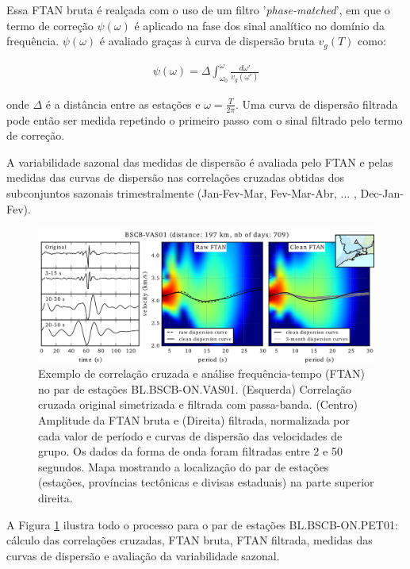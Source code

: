 Essa FTAN bruta é realçada com o uso de um filtro '\textit{phase-matched}', em que o termo de correção $\psi(\omega)$ é aplicado na fase dos sinal analítico no domínio da frequência. $\psi(\omega)$ é avaliado graças à curva de dispersão bruta $v_{g}(T)$ como:

\begin{eqnarray}
\psi(\omega) = \Delta \int_{\omega_{0}}^{\omega} \frac{{d\omega}'}{v_{g}({\omega}')}
\end{eqnarray}

onde $\Delta$ é a distância entre as estações e $\omega = \frac{T}{2\pi}$. Uma curva de dispersão filtrada pode então ser medida repetindo o primeiro passo com o sinal filtrado pelo termo de correção.

A variabilidade sazonal das medidas de dispersão é avaliada pelo FTAN e pelas medidas das curvas de dispersão nas correlações cruzadas obtidas dos subconjuntos sazonais trimestralmente (Jan-Fev-Mar, Fev-Mar-Abr, ... , Dec-Jan-Fev). 

\begin{figure}[!ht]
\centering
\includegraphics[scale=0.8]{Figs/correlacao_FTAN.png}
\caption[Exemplo de correlação cruzada e análise frequência-tempo (FTAN) no par de estações BL.BSCB-ON.PET01.]{Exemplo de correlação cruzada e análise frequência-tempo (FTAN) no par de estações BL.BSCB-ON.VAS01. (Esquerda) Correlação cruzada original simetrizada e filtrada com passa-banda. (Centro) Amplitude da FTAN bruta e (Direita) filtrada, normalizada por cada valor de período e curvas de dispersão das velocidades de grupo. Os dados da forma de onda foram filtradas entre 2 e 50 segundos. Mapa mostrando a localização do par de estações (estações, províncias tectônicas e divisas estaduais) na parte superior direita.}
\label{correlacao_FTAN}
\end{figure}

A Figura \ref{correlacao_FTAN} ilustra todo o processo para o par de estações BL.BSCB-ON.PET01: cálculo das correlações cruzadas, FTAN bruta, FTAN filtrada, medidas das curvas de dispersão e avaliação da variabilidade sazonal. 

